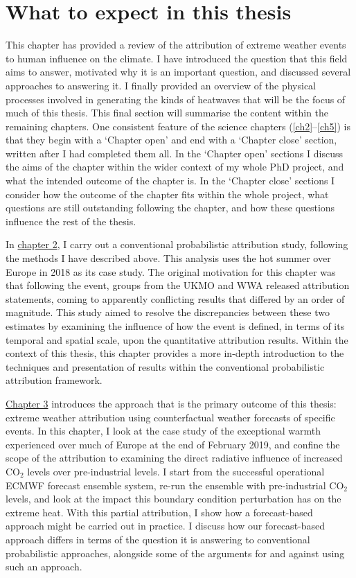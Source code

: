 \section{What to expect in this thesis}\label{intro:overview}

  This chapter has provided a review of the attribution of extreme weather events to human influence on the climate. I have introduced the question that this field aims to answer, motivated why it is an important question, and discussed several approaches to answering it. I finally provided an overview of the physical processes involved in generating the kinds of heatwaves that will be the focus of much of this thesis. This final section will summarise the content within the remaining chapters. One consistent feature of the science chapters (\ref{ch2}--\ref{ch5}) is that they begin with a `Chapter open' and end with a `Chapter close' section, written after I had completed them all. In the `Chapter open' sections I discuss the aims of the chapter within the wider context of my whole PhD project, and what the intended outcome of the chapter is. In the `Chapter close' sections I consider how the outcome of the chapter fits within the whole project, what questions are still outstanding following the chapter, and how these questions influence the rest of the thesis.

  In \hyperref[ch2]{chapter 2}, I carry out a conventional probabilistic attribution study, following the methods I have described above. This analysis uses the hot summer over Europe in 2018 as its case study. The original motivation for this chapter was that following the event, groups from the UKMO and WWA released attribution statements, coming to apparently conflicting results that differed by an order of magnitude. This study aimed to resolve the discrepancies between these two estimates by examining the influence of how the event is defined, in terms of its temporal and spatial scale, upon the quantitative attribution results. Within the context of this thesis, this chapter provides a more in-depth introduction to the techniques and presentation of results within the conventional probabilistic attribution framework.

  \hyperref[ch3]{Chapter 3} introduces the approach that is the primary outcome of this thesis: extreme weather attribution using counterfactual weather forecasts of specific events. In this chapter, I look at the case study of the exceptional warmth experienced over much of Europe at the end of February 2019, and confine the scope of the attribution to examining the direct radiative influence of increased CO$_2$ levels over pre-industrial levels. I start from the successful operational ECMWF forecast ensemble system, re-run the ensemble with pre-industrial CO$_2$ levels, and look at the impact this boundary condition perturbation has on the extreme heat. With this partial attribution, I show how a forecast-based approach might be carried out in practice. I discuss how our forecast-based approach differs in terms of the question it is answering to conventional probabilistic approaches, alongside some of the arguments for and against using such an approach.

